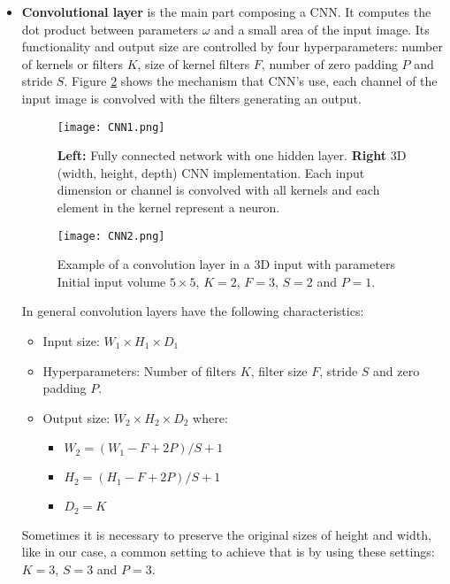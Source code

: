 \begin{itemize}
\item \textbf{Convolutional layer} is the main part composing a CNN. It computes the dot product between parameters $\omega$ and a small area of the input image. Its  functionality and output size are controlled by four hyperparameters: number of kernels or filters $K$, size of kernel filters $F$, number of zero padding $P$ and stride $S$. Figure \ref{fig:CNNim2} shows the mechanism that  CNN's use, each channel of the input image is convolved with the filters generating an output.  \

\begin{figure}[!tb] 
\centering 
\texttt{[image: CNN1.png]} 
\caption[Fully connected network VS CNN]{\textbf{Left:} Fully connected network with one hidden layer. \textbf{Right} 3D (width, height, depth) CNN implementation. Each input dimension or channel is convolved with all kernels and each element in the kernel represent a neuron.}
\label{fig:CNNim1} 
\end{figure}
\begin{figure}[!tb] 
\centering 
\texttt{[image: CNN2.png]} 
\caption[Convolution layer]{Example of a convolution layer in a 3D input with parameters Initial input volume $5 \times 5$, $K=2$, $F=3$, $S=2$ and $P=1$.}
\label{fig:CNNim2} 
\end{figure}


In general convolution layers have the following characteristics:
\begin{itemize}
\item Input size: \boldmath$W_1 \times H_1 \times D_1$
\item Hyperparameters: Number of filters \boldmath$K$, filter size \boldmath$F$, stride \boldmath$S$ and zero padding \boldmath$P$.  
\item Output size: \boldmath$W_2 \times H_2 \times D_2$ where:
\begin{itemize} \label{sec:outCNN}
\item \boldmath$W_2 = ( W_1 - F + 2P) / S + 1 $
\item \boldmath$H_2 = ( H_1 - F + 2P) / S + 1 $
\item \boldmath$D_2 = K $
\end{itemize}
\end{itemize}

Sometimes it is necessary to preserve the original sizes of height and width, like in our case, a common setting to achieve that is by using these settings: $K =3$, $S =3$ and $P =3$.   


\end{itemize}
